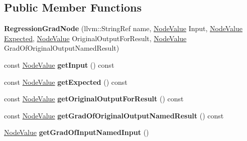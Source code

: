 \subsection*{Public Member Functions}
\begin{DoxyCompactItemize}
\item 
\mbox{\label{classglow_1_1_regression_grad_node_a84c1eb4861ca8f350a9fa02de4f070e2}} 
{\bfseries Regression\+Grad\+Node} (llvm\+::\+String\+Ref name, \hyperlink{structglow_1_1_node_value}{Node\+Value} Input, \hyperlink{structglow_1_1_node_value}{Node\+Value} \hyperlink{classglow_1_1detail_1_1_glow_expected}{Expected}, \hyperlink{structglow_1_1_node_value}{Node\+Value} Original\+Output\+For\+Result, \hyperlink{structglow_1_1_node_value}{Node\+Value} Grad\+Of\+Original\+Output\+Named\+Result)
\item 
\mbox{\label{classglow_1_1_regression_grad_node_ab4773b9e910f985bb90548b766cc312f}} 
const \hyperlink{structglow_1_1_node_value}{Node\+Value} {\bfseries get\+Input} () const
\item 
\mbox{\label{classglow_1_1_regression_grad_node_aa0d51391107cb648e2c17731b8c556f1}} 
const \hyperlink{structglow_1_1_node_value}{Node\+Value} {\bfseries get\+Expected} () const
\item 
\mbox{\label{classglow_1_1_regression_grad_node_a8404c832793c4ccf9a35aeb464a40691}} 
const \hyperlink{structglow_1_1_node_value}{Node\+Value} {\bfseries get\+Original\+Output\+For\+Result} () const
\item 
\mbox{\label{classglow_1_1_regression_grad_node_a8af400e2e9f86ae743c2b7f2f74a69ed}} 
const \hyperlink{structglow_1_1_node_value}{Node\+Value} {\bfseries get\+Grad\+Of\+Original\+Output\+Named\+Result} () const
\item 
\mbox{\label{classglow_1_1_regression_grad_node_ac9875d7042dec6928c6d933e24e70193}} 
\hyperlink{structglow_1_1_node_value}{Node\+Value} {\bfseries get\+Grad\+Of\+Input\+Named\+Input} ()
\item 
\mbox{\label{classglow_1_1_regression_grad_node_a310ccf3f8dd482242d81da2919ed652b}} 

\end{DoxyCompactItemize}
